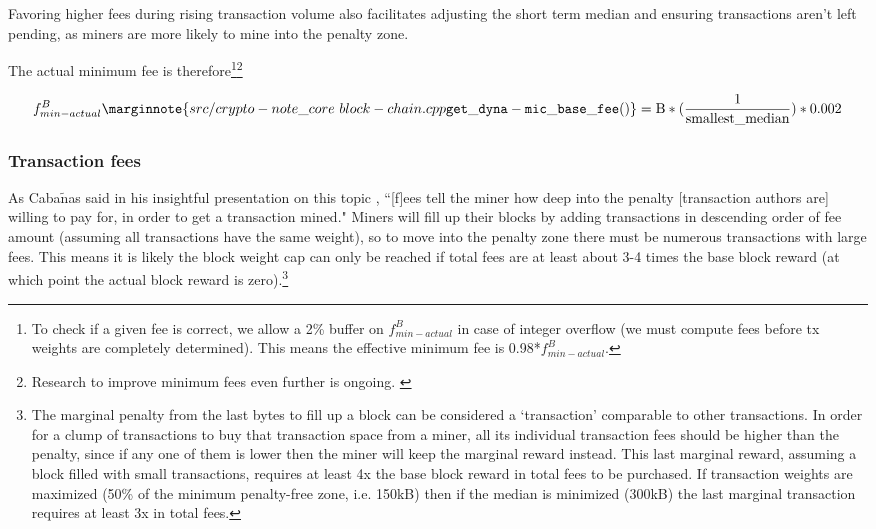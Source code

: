 Favoring higher fees during rising transaction volume also facilitates adjusting the short term median and ensuring transactions aren't left pending, as miners are more likely to mine into the penalty zone.

The actual minimum fee is therefore\footnote{To check if a given fee is correct, we allow a 2\% buffer on $f^{B}_{min-actual}$ in case of integer overflow (we must compute fees before tx weights are completely determined). This means the effective minimum fee is 0.98*$f^{B}_{min-actual}$.}\footnote{Research to improve minimum fees even further is ongoing. \cite{min-fee-research-issue-70}}%

\[f^{B}_{min-actual}\marginnote{src/crypto- note\_core\ block- chain.cpp {\tt get\_dyna- mic\_base\_ fee()}} = \textrm{B}*(\frac{1}{\textrm{smallest\_median}}) * 0.002\]

\subsubsection*{Transaction fees}

As Caba$\tilde{\textrm{n}}$as said in his insightful presentation on this topic \cite{articmine-36c3-dynamics}, ``[f]ees tell the miner how deep into the penalty [transaction authors are] willing to pay for, in order to get a transaction mined." Miners will fill up their blocks by adding transactions in descending order of fee amount \cite{articmine-36c3-dynamics} (assuming all transactions have the same weight), so to move into the penalty zone there must be numerous transactions with large fees. This means it is likely the block weight cap can only be reached if total fees are at least about 3-4 times the base block reward (at which point the actual block reward is zero).\footnote{\label{penaltyzonecost_footnote}The marginal penalty from the last bytes to fill up a block can be considered a `transaction' comparable to other transactions. In order for a clump of transactions to buy that transaction space from a miner, all its individual transaction fees should be higher than the penalty, since if any one of them is lower then the miner will keep the marginal reward instead. This last marginal reward, assuming a block filled with small transactions, requires at least 4x the base block reward in total fees to be purchased. If transaction weights are maximized (50\% of the minimum penalty-free zone, i.e. 150kB) then if the median is minimized (300kB) the last marginal transaction requires at least 3x in total fees.}

